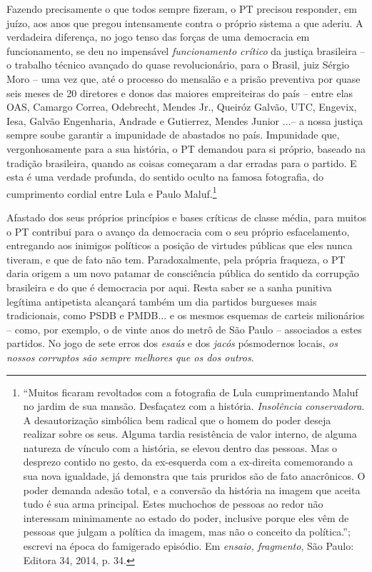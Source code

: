 Fazendo precisamente o que todos sempre fizeram, o PT precisou
responder, em juízo, aos anos que pregou intensamente contra o próprio
sistema a que aderiu. A verdadeira diferença, no jogo tenso das forças
de uma democracia em funcionamento, se deu no impensável
\emph{funcionamento crítico} da justiça brasileira -- o trabalho técnico
avançado do quase revolucionário, para o Brasil, juiz Sérgio Moro -- uma
vez que, até o processo do mensalão e a prisão preventiva por quase seis
meses de 20 diretores e donos das maiores empreiteiras do país -- entre
elas OAS, Camargo Correa, Odebrecht, Mendes Jr., Queiróz Galvão, UTC,
Engevix, Iesa, Galvão Engenharia, Andrade e Gutierrez, Mendes Junior
...-- a nossa justiça sempre soube garantir a impunidade de abastados no
país. Impunidade que, vergonhosamente para a sua história, o PT demandou
para si próprio, baseado na tradição brasileira, quando as coisas
começaram a dar erradas para o partido. E esta é uma verdade profunda,
do sentido oculto na famosa fotografia, do cumprimento cordial entre
Lula e Paulo Maluf.\footnote{``Muitos ficaram revoltados com a
  fotografia de Lula cumprimentando Maluf no jardim de sua mansão.
  Desfaçatez com a história. \emph{Insolência conservadora}. A
  desautorização simbólica bem radical que o homem do poder deseja
  realizar sobre os seus. Alguma tardia resistência de valor interno, de
  alguma natureza de vínculo com a história, se elevou dentro das
  pessoas. Mas o desprezo contido no gesto, da ex-esquerda com a
  ex-direita comemorando a sua nova igualdade, já demonstra que tais
  pruridos são de fato anacrônicos. O poder demanda adesão total, e a
  conversão da história na imagem que aceita tudo é sua arma principal.
  Estes muchochos de pessoas ao redor não interessam minimamente ao
  estado do poder, inclusive porque eles vêm de pessoas que julgam a
  política da imagem, mas não o conceito da política.''; escrevi na
  época do famigerado episódio. Em \emph{ensaio, fragmento}, São Paulo:
  Editora 34, 2014, p. 34.}

Afastado dos seus próprios princípios e bases críticas de classe média,
para muitos o PT contribui para o avanço da democracia com o seu próprio
esfacelamento, entregando aos inimigos políticos a posição de virtudes
públicas que eles nunca tiveram, e que de fato não tem. Paradoxalmente,
pela própria fraqueza, o PT daria origem a um novo patamar de
consciência pública do sentido da corrupção brasileira e do que é
democracia por aqui. Resta saber se a sanha punitiva legítima
antipetista alcançará também um dia partidos burgueses mais
tradicionais, como PSDB e PMDB... e os mesmos esquemas de carteis
milionários -- como, por exemplo, o de vinte anos do metrô de São Paulo
-- associados a estes partidos. No jogo de sete erros dos \emph{esaús} e
dos \emph{jacós} pósmodernos locais, \emph{os nossos corruptos são
sempre melhores que os dos outros}.

